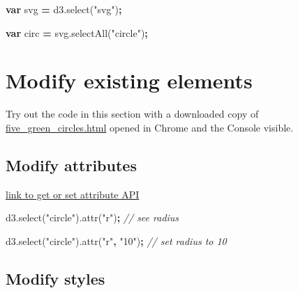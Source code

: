 \documentclass[openany]{book}
\newenvironment{Shaded}{\begin{snugshade}}{\end{snugshade}}
\newcommand{\AttributeTok}[1]{\textcolor[rgb]{0.77,0.63,0.00}{#1}}
\newcommand{\CommentTok}[1]{\textcolor[rgb]{0.56,0.35,0.01}{\textit{#1}}}
\newcommand{\KeywordTok}[1]{\textcolor[rgb]{0.13,0.29,0.53}{\textbf{#1}}}
\newcommand{\NormalTok}[1]{#1}
\newcommand{\OperatorTok}[1]{\textcolor[rgb]{0.81,0.36,0.00}{\textbf{#1}}}
\newcommand{\StringTok}[1]{\textcolor[rgb]{0.31,0.60,0.02}{#1}}
\newcommand{\VariableTok}[1]{\textcolor[rgb]{0.00,0.00,0.00}{#1}}
\begin{document}
\begin{Shaded}
\begin{Highlighting}[]
\KeywordTok{var}\NormalTok{ svg }\OperatorTok{=} \VariableTok{d3}\NormalTok{.}\AttributeTok{select}\NormalTok{(}\StringTok{"svg"}\NormalTok{)}\OperatorTok{;}

\KeywordTok{var}\NormalTok{ circ }\OperatorTok{=} \VariableTok{svg}\NormalTok{.}\AttributeTok{selectAll}\NormalTok{(}\StringTok{"circle"}\NormalTok{)}\OperatorTok{;}
\end{Highlighting}
\end{Shaded}

\hypertarget{modify-existing-elements}{%
\section{Modify existing elements }\label{modify-existing-elements}}

Try out the code in this section with a downloaded copy of \href{https://raw.githubusercontent.com/jtr13/d3book/master/code/five_green_circles.html}{five\_green\_circles.html} opened in Chrome and the Console visible.

\hypertarget{modify-attributes}{%
\subsection{Modify attributes}\label{modify-attributes}}

\href{https://github.com/d3/d3-selection/blob/v1.4.0/README.md\#selection_attr}{link to get or set attribute API}

\begin{Shaded}
\begin{Highlighting}[]
\VariableTok{d3}\NormalTok{.}\AttributeTok{select}\NormalTok{(}\StringTok{"circle"}\NormalTok{).}\AttributeTok{attr}\NormalTok{(}\StringTok{"r"}\NormalTok{)}\OperatorTok{;}           \CommentTok{// see radius}

\VariableTok{d3}\NormalTok{.}\AttributeTok{select}\NormalTok{(}\StringTok{"circle"}\NormalTok{).}\AttributeTok{attr}\NormalTok{(}\StringTok{"r"}\OperatorTok{,} \StringTok{"10"}\NormalTok{)}\OperatorTok{;}     \CommentTok{// set radius to 10}
\end{Highlighting}
\end{Shaded}

\hypertarget{modify-styles}{%
\subsection{Modify styles}\label{modify-styles}}
\end{document}
